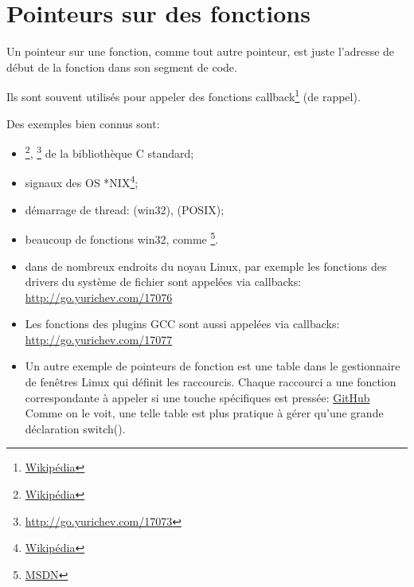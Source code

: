 \newcommand{\comp}{\TT{comp()}\xspace}
\section{Pointeurs sur des fonctions}
\label{sec:pointerstofunctions}

\myindex{\CLanguageElements!\Pointers}

Un pointeur sur une fonction, comme tout autre pointeur, est juste l'adresse de début
de la fonction dans son segment de code.

Ils sont souvent utilisés pour appeler des fonctions callback\footnote{\href{http://go.yurichev.com/17071}{Wikipédia}}
(de rappel).

Des exemples bien connus sont:

\begin{itemize}
\item \qsort\footnote{\href{http://go.yurichev.com/17072}{Wikipédia}},
{}\footnote{\url{http://go.yurichev.com/17073}} de la bibliothèque C standard; 

\item signaux des OS *NIX\footnote{\href{http://go.yurichev.com/17074}{Wikipédia}};

\item démarrage de thread:  (win32),  (POSIX);

\item beaucoup de fonctions win32, comme \footnote{\href{http://go.yurichev.com/17075}{MSDN}}.

\item dans de nombreux endroits du noyau Linux, par exemple les fonctions des drivers
du système de fichier sont appelées via callbacks: \url{http://go.yurichev.com/17076}

\item Les fonctions des plugins GCC sont aussi appelées via callbacks: 
\url{http://go.yurichev.com/17077}

\item Un autre exemple de pointeurs de fonction est une table dans le gestionnaire
de fenêtres Linux  qui définit les raccourcis. Chaque raccourci a une fonction
correspondante à appeler si une touche spécifiques est pressée: \href{http://go.yurichev.com/17078}{GitHub}
Comme on le voit, une telle table est plus pratique à gérer qu'une grande déclaration
switch().
\end{itemize}


